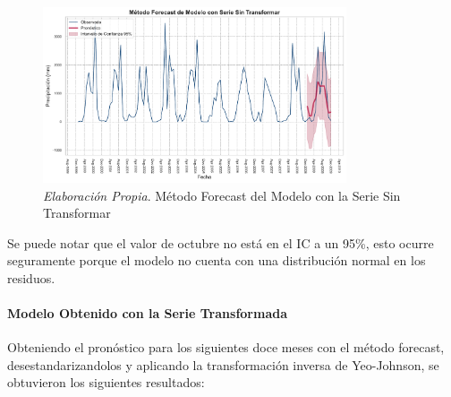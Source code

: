 \documentclass[12pt,letterpaper]{article}   %
\begin{document}
\begin{figure}[ht]
    \centering
    \includegraphics[width=0.8\textwidth]{imagenes/05-02-metodo-forecast-zoom.pdf}
    \caption{\textit{Elaboración Propia}. Método Forecast del Modelo con la Serie Sin Transformar}
\end{figure}

Se puede notar que el valor de octubre no está en el IC a un 95\%, esto ocurre seguramente porque el modelo no cuenta con una distribución normal en los residuos. 

\newpage
  \paragraph{Modelo Obtenido con la Serie Transformada}
  Obteniendo el pronóstico para los siguientes doce meses con el método forecast, desestandarizandolos y aplicando la transformación inversa de Yeo-Johnson, se obtuvieron los siguientes resultados: 
\end{document}

